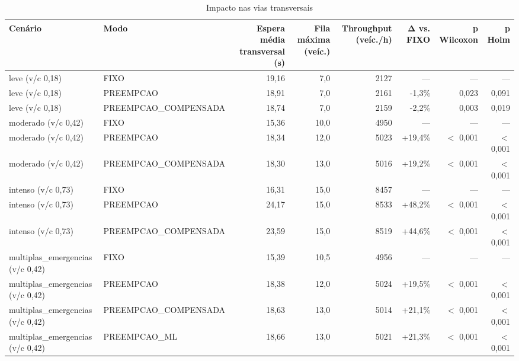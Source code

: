 \begin{table}[htbp]
\centering
\caption{Impacto nas vias transversais}
\label{tab:t3}
\small
\begin{tabular}{llrrrrrr}
\toprule
Cenário & Modo & Espera média transversal (s) & Fila máxima (veíc.) & Throughput (veíc./h) & Δ vs. FIXO & p Wilcoxon & p Holm \\
\midrule
leve (v/c 0,18) & FIXO & 19,16 & 7,0 & 2127 & — & — & — \\
leve (v/c 0,18) & PREEMPCAO & 18,91 & 7,0 & 2161 & -1,3\% & 0,023 & 0,091 \\
leve (v/c 0,18) & PREEMPCAO\_COMPENSADA & 18,74 & 7,0 & 2159 & -2,2\% & 0,003 & 0,019 \\
moderado (v/c 0,42) & FIXO & 15,36 & 10,0 & 4950 & — & — & — \\
moderado (v/c 0,42) & PREEMPCAO & 18,34 & 12,0 & 5023 & +19,4\% & $<$ 0,001 & $<$ 0,001 \\
moderado (v/c 0,42) & PREEMPCAO\_COMPENSADA & 18,30 & 13,0 & 5016 & +19,2\% & $<$ 0,001 & $<$ 0,001 \\
intenso (v/c 0,73) & FIXO & 16,31 & 15,0 & 8457 & — & — & — \\
intenso (v/c 0,73) & PREEMPCAO & 24,17 & 15,0 & 8533 & +48,2\% & $<$ 0,001 & $<$ 0,001 \\
intenso (v/c 0,73) & PREEMPCAO\_COMPENSADA & 23,59 & 15,0 & 8519 & +44,6\% & $<$ 0,001 & $<$ 0,001 \\
multiplas\_emergencias (v/c 0,42) & FIXO & 15,39 & 10,5 & 4956 & — & — & — \\
multiplas\_emergencias (v/c 0,42) & PREEMPCAO & 18,38 & 12,0 & 5024 & +19,5\% & $<$ 0,001 & $<$ 0,001 \\
multiplas\_emergencias (v/c 0,42) & PREEMPCAO\_COMPENSADA & 18,63 & 13,0 & 5014 & +21,1\% & $<$ 0,001 & $<$ 0,001 \\
multiplas\_emergencias (v/c 0,42) & PREEMPCAO\_ML & 18,66 & 13,0 & 5021 & +21,3\% & $<$ 0,001 & $<$ 0,001 \\
\bottomrule
\end{tabular}
\end{table}
